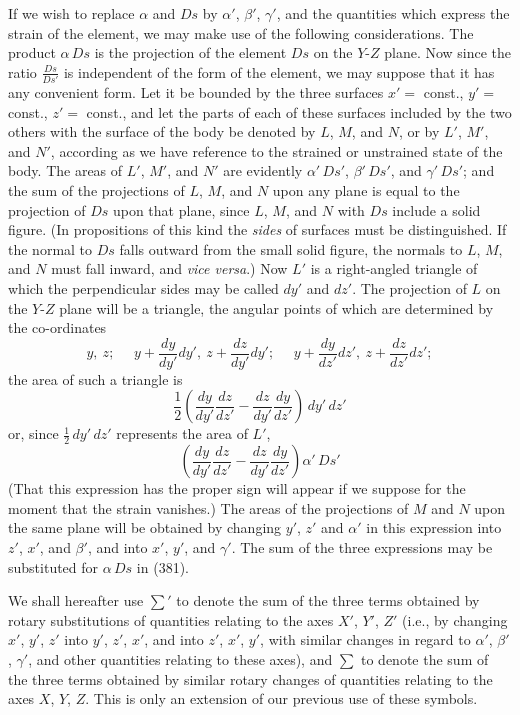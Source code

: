 \documentclass[12pt]{memoir}
\begin{document}
{If we wish to replace $\alpha$ and $Ds$ by $\alpha'$, $\beta'$, $\gamma'$, and the quantities which express the strain of the element, we may make use of the following considerations. The product $\alpha \, Ds$ is the projection of the element $Ds$ on the $Y$-$Z$ plane. Now since the ratio $\frac{Ds}{Ds'}$ is independent of the form of the element, we may suppose that it has any convenient form. Let it be bounded by the three surfaces $x'=$ const., $y'=$ const., $z'=$ const., and let the parts of each of these surfaces included by the two others with the surface of the body be denoted by $L$, $M$, and $N$, or by $L'$, $M'$, and $N'$, according as we have reference to the strained or unstrained state of the body. The areas of $L'$, $M'$, and $N'$ are evidently $\alpha'\,Ds'$, $\beta'\,Ds'$, and $\gamma'\,Ds'$; and the sum of the projections of $L$, $M$, and $N$ upon any plane is equal to the projection of $Ds$ upon that plane, since $L$, $M$, and $N$ with $Ds$ include a solid figure. (In propositions of this kind the \textit{sides} of surfaces must be distinguished. If the normal to $Ds$ falls outward from the small solid figure, the normals to $L$, $M$, and $N$ must fall inward, and \textit{vice versa}.) Now $L'$ is a right-angled triangle of which the perpendicular sides may be called $dy'$ and $dz'$. The projection of $L$ on the $Y$-$Z$ plane will be a triangle, the angular points of which are determined by the co-ordinates
$$y, \  z; \ \ \ \ \ \ y+ \frac{dy}{dy'}dy', \ z+\frac{dz}{dy'}dy'; \ \ \ \ \ \ y + \frac{dy}{dz'}d z', \  z+ \frac{dz}{dz'}dz';$$
the area of such a triangle is
$$\frac{1}{2}\left(\frac{dy}{dy'} \frac{dz}{dz'} -  \frac{dz}{dy'} \frac{dy}{dz'} \right) \,dy' \,dz'$$
or, since $\frac{1}{2} \, dy' \, dz'$ represents the area of $L'$,
$$
\left(\frac{dy}{dy'}\frac{dz}{dz'}-\frac{dz}{dy'}\frac{dy}{dz'} \right)\alpha'\, Ds'$$
(That this expression has the proper sign will appear if we suppose for the moment that the strain vanishes.) The areas of the projections of $M$ and $N$ upon the same plane will be obtained by changing $y'$, $z'$ and $\alpha'$ in this expression into $z'$, $x'$, and $\beta'$, and into $x'$, $y'$, and $\gamma'$. The sum of the three expressions may be substituted for $\alpha \,Ds$ in (381).


We shall hereafter use $\sum\nolimits'$ to denote the sum of the three terms obtained by rotary substitutions of quantities relating to the axes $X'$, $Y'$, $Z'$ (i.e., by changing $x'$, $y'$, $z'$ into $y'$, $z'$, $x'$, and into $z'$, $x'$, $y'$, with similar changes in regard to $\alpha'$, $\beta'$, $\gamma'$, and other quantities relating to these axes), and $\sum$ to denote the sum of the three terms obtained by similar rotary changes of quantities relating to the axes $X$, $Y$, $Z$. This is only an extension of our previous use of these symbols.


}
\end{document}
